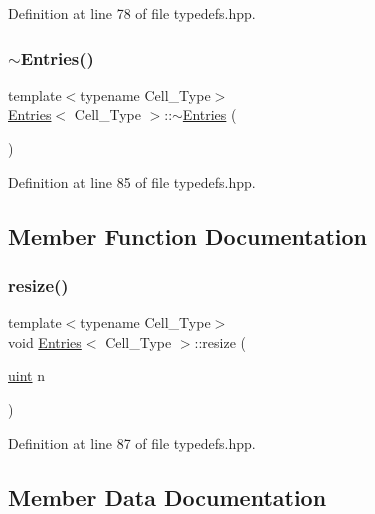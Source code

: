 Definition at line 78 of file typedefs.\+hpp.

\mbox{\label{class_entries_aeda42186376731bd3a9b3902a09395a4}} 
\subsubsection{\texorpdfstring{$\sim$\+Entries()}{~Entries()}}
{\footnotesize\ttfamily template$<$typename Cell\+\_\+\+Type$>$ \\
\hyperlink{class_entries}{Entries}$<$ Cell\+\_\+\+Type $>$\+::$\sim$\hyperlink{class_entries}{Entries} (\begin{DoxyParamCaption}{ }\end{DoxyParamCaption})\hspace{0.3cm}{\ttfamily [inline]}}



Definition at line 85 of file typedefs.\+hpp.



\subsection{Member Function Documentation}
\mbox{\label{class_entries_a8b539e4c53aab5d6ce8305af346b7089}} 
\subsubsection{\texorpdfstring{resize()}{resize()}}
{\footnotesize\ttfamily template$<$typename Cell\+\_\+\+Type$>$ \\
void \hyperlink{class_entries}{Entries}$<$ Cell\+\_\+\+Type $>$\+::resize (\begin{DoxyParamCaption}\item[{\hyperlink{typedefs_8hpp_a91ad9478d81a7aaf2593e8d9c3d06a14}{uint}}]{n }\end{DoxyParamCaption})\hspace{0.3cm}{\ttfamily [inline]}}



Definition at line 87 of file typedefs.\+hpp.



\subsection{Member Data Documentation}
\mbox{\label{class_entries_a6a7c589df4cd6ea98386466440dfdc98}} 
